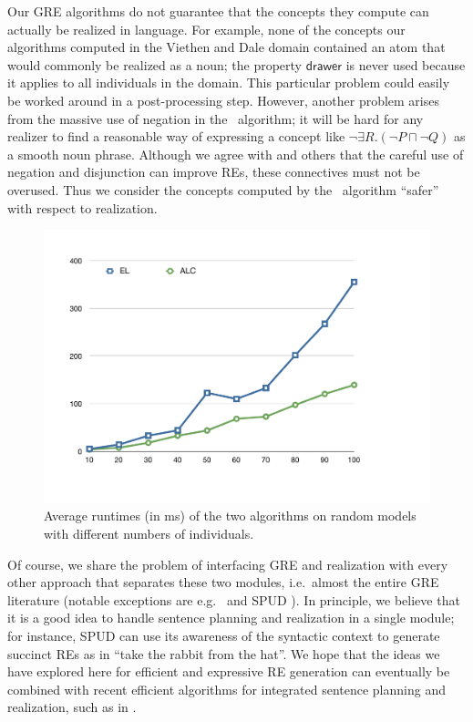 Our GRE algorithms do not guarantee that the concepts they compute can
actually be realized in language.  For example, none of the concepts
our algorithms computed in the Viethen and Dale domain contained an
atom that would commonly be realized as a noun; the property
$\mathsf{drawer}$ is never used because it applies to all individuals
in the domain.  This particular problem could easily be worked around
in a post-processing step.  However, another problem arises from the
massive use of negation in the \alc\ algorithm; it will be hard for
any realizer to find a reasonable way of expressing a concept like
$\neg \exists R.(\neg P \sqcap \neg Q)$ as a smooth noun phrase.
Although we agree with  and
others that the careful use of negation and disjunction can improve
REs, these connectives must not be overused.  Thus we consider the
concepts computed by the \el\ algorithm ``safer'' with respect to
realization.


\begin{figure}[t]
  \centering
  \includegraphics[width=\columnwidth]{runtimes}
  \caption{Average runtimes (in ms) of the two algorithms on random
    models with different numbers of individuals.}%
  \label{fig:runtimes}
\end{figure}

Of course, we share the problem of interfacing GRE and realization
with every other approach that separates these two modules, i.e.\
almost the entire GRE literature (notable exceptions are e.g.\
 and SPUD \cite{Stone1998a}).  In principle, we
believe that it is a good idea to handle sentence planning and
realization in a single module; for instance, SPUD can use its
awareness of the syntactic context to generate succinct REs as in
``take the rabbit from the hat''.  We hope that the ideas we have
explored here for efficient and expressive RE generation can
eventually be combined with recent efficient algorithms for integrated
sentence planning and realization, such as in .


